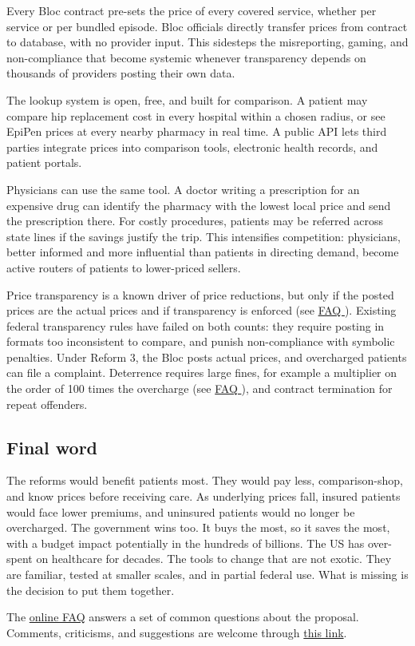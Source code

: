 \documentclass[12pt]{article}
\begin{document}
Every Bloc contract pre-sets the price of every covered service, whether per service or per bundled episode. Bloc officials directly transfer prices from contract to database, with no provider input. This sidesteps the misreporting, gaming, and non-compliance that become systemic whenever transparency depends on thousands of providers posting their own data.

The lookup system is open, free, and built for comparison. A patient may compare hip replacement cost in every hospital within a chosen radius, or see EpiPen prices at every nearby pharmacy in real time. A public API lets third parties integrate prices into comparison tools, electronic health records, and patient portals.

Physicians can use the same tool. A doctor writing a prescription for an expensive drug can identify the pharmacy with the lowest local price and send the prescription there. For costly procedures, patients may be referred across state lines if the savings justify the trip. This intensifies competition: physicians, better informed and more influential than patients in directing demand, become active routers of patients to lower-priced sellers.

Price transparency is a known driver of price reductions,\citep{robinson2013calpers, whaley2019nh} but only if the posted prices are the actual prices and if transparency is enforced (see \href{https://rabbanimaysam.github.io/health_reform/faq.html}{FAQ \faqNovelty}). Existing federal transparency rules have failed on both counts:\citep{jiang2022transparency} they require posting in formats too inconsistent to compare, and punish non-compliance with symbolic penalties. Under Reform 3, the Bloc posts actual prices, and overcharged patients can file a complaint. Deterrence requires large fines, for example a multiplier on the order of 100 times the overcharge (see \href{https://rabbanimaysam.github.io/health_reform/faq.html}{FAQ \faqFines}), and contract termination for repeat offenders.

\subsection*{Final word}

The reforms would benefit patients most. They would pay less, comparison-shop, and know prices before receiving care. As underlying prices fall, insured patients would face lower premiums, and uninsured patients would no longer be overcharged. The government wins too. It buys the most, so it saves the most, with a budget impact potentially in the hundreds of billions. The US has over-spent on healthcare for decades. The tools to change that are not exotic. They are familiar, tested at smaller scales, and in partial federal use. What is missing is the decision to put them together.

The \href{https://rabbanimaysam.github.io/health_reform/faq.html}{online FAQ} answers a set of common questions about the proposal. Comments, criticisms, and suggestions are welcome through \href{https://rabbanimaysam.github.io/health_reform/}{this link}.

{\scriptsize
\setlength{\bibsep}{0pt}

}
\end{document}
